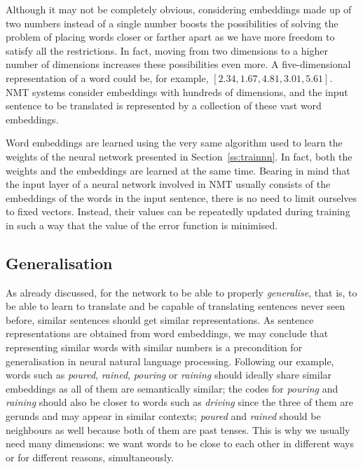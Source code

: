 \documentclass[output=paper,colorlinks,citecolor=brown]{langscibook}
\begin{document}
Although it may not be completely obvious, considering embeddings made up of two numbers instead of a single number boosts the possibilities of solving the problem of placing words closer or farther apart as we have more freedom to satisfy all the restrictions. In fact, moving from two dimensions to a higher number of dimensions increases these possibilities even more. A 
five-dimensional
representation of a word could be, for example, $[2.34, 1.67, 4.81, 3.01, 5.61]$. NMT systems consider embeddings with hundreds of dimensions, and the input sentence to be translated is represented by a collection of these vast word embeddings.

Word embeddings are learned using the very same 
algorithm used to learn the weights of the neural network presented in Section~\ref{ss:trainnn}. In fact, both the weights and the embeddings are learned at the same time. Bearing in mind that the input layer of a neural network involved in NMT usually consists of the embeddings of the words in the input sentence, there is no need to limit ourselves to fixed vectors. Instead, their values can be repeatedly updated during training in such a way that the value of the error function is minimised.

\subsection{Generalisation}

As already discussed, for the network to be able to properly \emph{generalise}, that is, to be able to learn to translate and be capable of translating sentences never seen before, similar sentences should get similar representations. As sentence representations are obtained from word embeddings, we may conclude that representing similar words with 
similar
numbers is a precondition for generalisation in neural natural language processing. Following our example, words such as \emph{poured}, \emph{rained}, \emph{pouring} or \emph{raining} should ideally share similar embeddings as all of them are semantically similar; the codes for \emph{pouring} and \emph{raining} should also be closer to words such as \emph{driving} since the three of them are gerunds and may appear in similar contexts; \emph{poured} and \emph{rained} should be neighbours as well because both of them are past tenses. 
This is why we usually need many dimensions: we want words to be close to each other in different ways or for different reasons, simultaneously.
\end{document}
